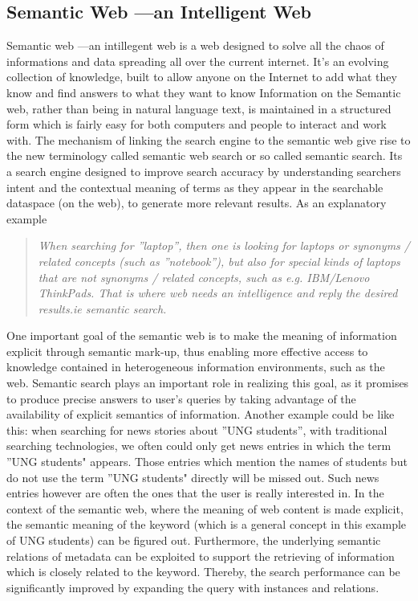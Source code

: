 \documentclass[12pt,a4]{article}
\begin{document}
\subsection{Semantic Web ---an Intelligent Web}
Semantic web ---an intillegent web is a web designed to solve all the chaos of informations and data spreading all over the current internet. It's an evolving collection of knowledge, built to allow anyone on the Internet to add what they know and find answers to what they want to know\cite{Sandro} Information on the Semantic web, rather than being in natural language text, is maintained in a structured form which is fairly easy for both computers and people to interact and work with. 
The mechanism of linking the search engine to the semantic web give rise to the new terminology called semantic web search or so called semantic search. Its a search engine designed to improve search accuracy by understanding searchers intent and the contextual meaning of terms as they appear in the searchable dataspace (on the web), to generate more relevant results. As an explanatory example
\begin{quote}\textit{When searching for ''laptop'', then one is looking for laptops or synonyms / related concepts (such as ''notebook''), but also for special kinds of laptops that are not synonyms / related concepts, such as e.g. IBM/Lenovo ThinkPads. That is where web needs an intelligence and reply the desired results.ie semantic search.}\end{quote}

One important goal of the semantic web is to make the meaning of information explicit through semantic mark-up, thus enabling more effective access to knowledge contained in heterogeneous information environments, such as the web. Semantic search plays an important role in realizing this goal, as it promises to produce precise answers to user’s queries by taking advantage of the availability of explicit semantics of information. Another example could be like this: when searching for news stories about ''UNG students'', with traditional searching technologies, we often could only get news entries in which the term ''UNG students" appears. Those entries which mention the names of students but do not use the term ''UNG students" directly will be missed out. Such news entries however are often the ones that the user is really interested in. In the context of the semantic web, where the meaning of web content is made explicit, the semantic meaning of the keyword (which is a general concept in this example of UNG students) can be figured out. Furthermore, the underlying semantic relations of metadata can be exploited to support the retrieving of information which is closely related to the keyword. Thereby, the search performance can be significantly improved by expanding the query with instances and relations.
\end{document}
